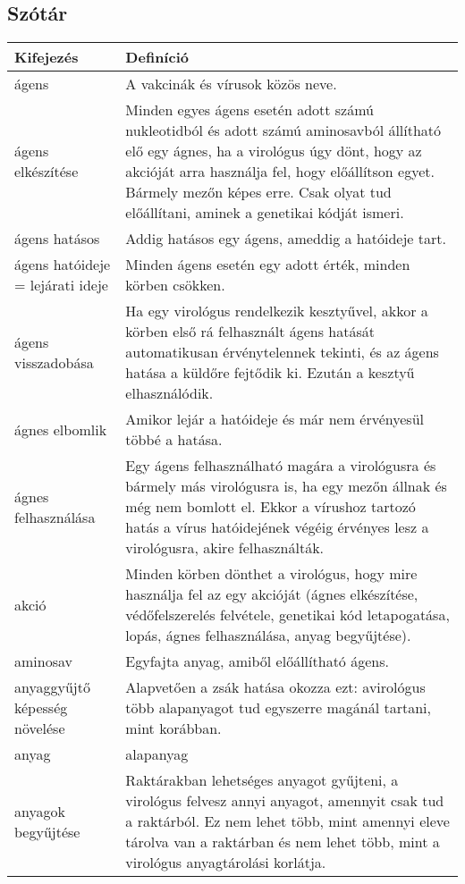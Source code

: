 
\subsection{Szótár}

\noindent\begin{xltabular}{\textwidth}{|l|X|}
	\hline
	\textbf{Kifejezés} & \textbf{Definíció} \\
	\hline
	\hline
	ágens & A vakcinák és vírusok közös neve. \\
	\hline
	ágens elkészítése & Minden egyes ágens esetén adott számú nukleotidból és adott számú aminosavból állítható elő egy ágnes, ha a virológus úgy dönt, hogy az akcióját arra használja fel, hogy előállítson egyet. Bármely mezőn képes erre. Csak olyat tud előállítani, aminek a genetikai kódját ismeri.  \\
	\hline
	ágens hatásos & Addig hatásos egy ágens, ameddig a hatóideje tart. \\
	\hline
	ágens hatóideje = lejárati ideje & Minden ágens esetén egy adott érték, minden körben csökken. \\
	\hline
	ágens visszadobása & Ha egy virológus rendelkezik kesztyűvel, akkor a körben első rá felhasznált ágens hatását automatikusan érvénytelennek tekinti, és az ágens hatása a küldőre fejtődik ki. Ezután a kesztyű elhasználódik. \\
	\hline
	ágnes elbomlik & Amikor lejár a hatóideje és már nem érvényesül többé a hatása.  \\
	\hline
	ágnes felhasználása & Egy ágens felhasználható magára a virológusra és bármely más virológusra is, ha egy mezőn állnak és még nem bomlott el. Ekkor a vírushoz tartozó hatás a vírus hatóidejének végéig érvényes lesz a virológusra, akire felhasználták. \\
	\hline
	akció & Minden körben dönthet a virológus, hogy mire használja fel az egy akcióját (ágnes elkészítése, védőfelszerelés felvétele, genetikai kód letapogatása, lopás, ágnes felhasználása, anyag begyűjtése). \\
	\hline
	aminosav & Egyfajta anyag, amiből előállítható ágens. \\
	\hline
	anyaggyűjtő képesség növelése & Alapvetően a zsák hatása okozza ezt: avirológus több alapanyagot tud egyszerre magánál tartani, mint korábban. \\
	\hline
	anyag & alapanyag \\
	\hline
	anyagok begyűjtése & Raktárakban lehetséges anyagot gyűjteni, a virológus felvesz annyi anyagot, amennyit csak tud a raktárból. Ez nem lehet több, mint amennyi eleve tárolva van a raktárban és nem lehet több, mint a virológus anyagtárolási korlátja. \\

\end{xltabular}
